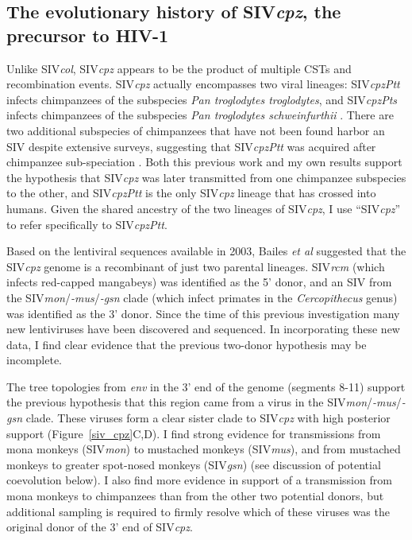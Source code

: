 \subsection{The evolutionary history of SIV\textit{cpz}, the precursor to HIV-1}
Unlike SIV\textit{col}, SIV\textit{cpz} appears to be the product of multiple CSTs and recombination events.
SIV\textit{cpz} actually encompasses two viral lineages: SIV\textit{cpzPtt} infects chimpanzees of the subspecies \textit{Pan troglodytes troglodytes}, and SIV\textit{cpzPts} infects chimpanzees of the subspecies \textit{Pan troglodytes schweinfurthii} \citep{santiago2002SIVcpz}.
There are two additional subspecies of chimpanzees that have not been found harbor an SIV despite extensive surveys, suggesting that SIV\textit{cpzPtt} was acquired after chimpanzee sub-speciation \citep{leitner2007sequence}.
Both this previous work and my own results support the hypothesis that SIV\textit{cpz} was later transmitted from one chimpanzee subspecies to the other, and SIV\textit{cpzPtt} is the only SIV\textit{cpz} lineage that has crossed into humans.
Given the shared ancestry of the two lineages of SIV\textit{cpz}, I use “SIV\textit{cpz}” to refer specifically to SIV\textit{cpzPtt}.

Based on the lentiviral sequences available in 2003, Bailes \textit{et al} \citep{bailes2003hybrid} suggested that the SIV\textit{cpz} genome is a recombinant of just two parental lineages.
SIV\textit{rcm} (which infects red-capped mangabeys) was identified as the 5' donor, and an SIV from the SIV\textit{mon}/\textit{-mus}/\textit{-gsn} clade (which infect primates in the \textit{Cercopithecus} genus) was identified as the 3' donor.
Since the time of this previous investigation many new lentiviruses have been discovered and sequenced.
In incorporating these new data, I find clear evidence that the previous two-donor hypothesis may be incomplete.

The tree topologies from \textit{env} in the 3' end of the genome (segments 8-11) support the previous hypothesis \citep{bailes2003hybrid} that this region came from a virus in the SIV\textit{mon}/\textit{-mus}/\textit{-gsn} clade.
These viruses form a clear sister clade to SIV\textit{cpz} with high posterior support (Figure~\ref{siv_cpz}C,D).
I find strong evidence for transmissions from mona monkeys (SIV\textit{mon}) to mustached monkeys (SIV\textit{mus}), and from mustached monkeys to greater spot-nosed monkeys (SIV\textit{gsn}) (see discussion of potential coevolution below).
I also find more evidence in support of a transmission from mona monkeys to chimpanzees than from the other two potential donors, but additional sampling is required to firmly resolve which of these viruses was the original donor of the 3' end of SIV\textit{cpz}.


